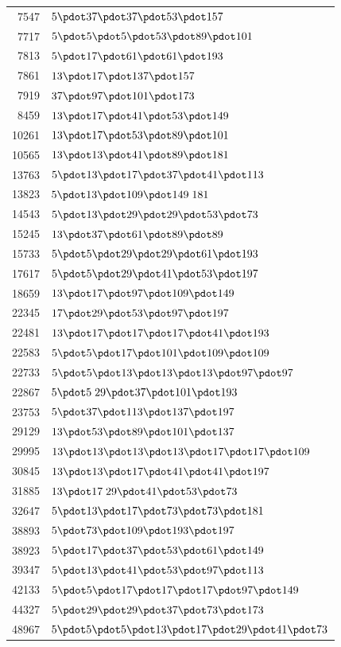 \begin{longtable}{@{}r|l@{}}
7547 & $5\pdot 37\pdot 37\pdot 53\pdot 157$\\
7717 & $5\pdot 5\pdot 5\pdot 53\pdot 89\pdot 101$\\
7813 & $5\pdot 17\pdot 61\pdot 61\pdot 193$\\
7861 & $13\pdot 17\pdot 137\pdot 157$\\
7919 & $37\pdot 97\pdot 101\pdot 173$\\
8459 & $13\pdot 17\pdot 41\pdot 53\pdot 149$\\
10261 & $13\pdot 17\pdot 53\pdot 89\pdot 101$\\
10565 & $13\pdot 13\pdot 41\pdot 89\pdot 181$\\
13763 & $5\pdot 13\pdot 17\pdot 37\pdot 41\pdot 113$\\
13823 & $5\pdot 13\pdot 109\pdot 149\;181$\\
14543 & $5\pdot 13\pdot 29\pdot 29\pdot 53\pdot 73$\\
15245 & $13\pdot 37\pdot 61\pdot 89\pdot 89$\\
15733 & $5\pdot 5\pdot 29\pdot 29\pdot 61\pdot 193$\\
17617 & $5\pdot 5\pdot 29\pdot 41\pdot 53\pdot 197$\\
18659 & $13\pdot 17\pdot 97\pdot 109\pdot 149$\\
22345 & $17\pdot 29\pdot 53\pdot 97\pdot 197$\\
22481 & $13\pdot 17\pdot 17\pdot 17\pdot 41\pdot 193$\\
22583 & $5\pdot 5\pdot 17\pdot 101\pdot 109\pdot 109$\\
22733 & $5\pdot 5\pdot 13\pdot 13\pdot 13\pdot 97\pdot 97$\\
22867 & $5\pdot 5\;29\pdot 37\pdot 101\pdot 193$\\
23753 & $5\pdot 37\pdot 113\pdot 137\pdot 197$\\
29129 & $13\pdot 53\pdot 89\pdot 101\pdot 137$\\
29995 & $13\pdot 13\pdot 13\pdot 13\pdot 17\pdot 17\pdot 109$\\
30845 & $13\pdot 13\pdot 17\pdot 41\pdot 41\pdot 197$\\
31885 & $13\pdot 17\;29\pdot 41\pdot 53\pdot 73$\\
32647 & $5\pdot 13\pdot 17\pdot 73\pdot 73\pdot 181$\\
38893 & $5\pdot 73\pdot 109\pdot 193\pdot 197$\\
38923 & $5\pdot 17\pdot 37\pdot 53\pdot 61\pdot 149$\\
39347 & $5\pdot 13\pdot 41\pdot 53\pdot 97\pdot 113$\\
42133 & $5\pdot 5\pdot 17\pdot 17\pdot 17\pdot 97\pdot 149$\\
44327 & $5\pdot 29\pdot 29\pdot 37\pdot 73\pdot 173$\\
48967 & $5\pdot 5\pdot 5\pdot 13\pdot 17\pdot 29\pdot 41\pdot 73$\\
\end{longtable}\endgroup
